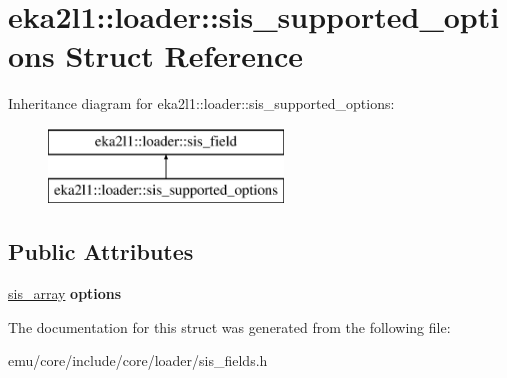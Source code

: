 \hypertarget{structeka2l1_1_1loader_1_1sis__supported__options}{}\section{eka2l1\+:\+:loader\+:\+:sis\+\_\+supported\+\_\+options Struct Reference}
\label{structeka2l1_1_1loader_1_1sis__supported__options}
Inheritance diagram for eka2l1\+:\+:loader\+:\+:sis\+\_\+supported\+\_\+options\+:\begin{figure}[H]
\begin{center}
\leavevmode
\includegraphics[height=2.000000cm]{structeka2l1_1_1loader_1_1sis__supported__options}
\end{center}
\end{figure}
\subsection*{Public Attributes}
\begin{DoxyCompactItemize}
\item 
\mbox{\label{structeka2l1_1_1loader_1_1sis__supported__options_a6c909da47a12ef56df25d489ef95ae2d}} 
\mbox{\hyperlink{structeka2l1_1_1loader_1_1sis__array}{sis\+\_\+array}} {\bfseries options}
\end{DoxyCompactItemize}


The documentation for this struct was generated from the following file\+:\begin{DoxyCompactItemize}
\item 
emu/core/include/core/loader/sis\+\_\+fields.\+h\end{DoxyCompactItemize}
